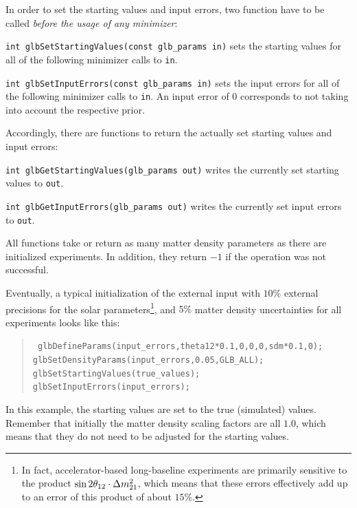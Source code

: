 In order to set the starting values and input errors, two function have to
 be called {\em before the usage of any minimizer}:
\begin{function}
{\tt int glbSetStartingValues(const glb\_params in)} sets the starting values for all of the following minimizer calls to {\tt in}.
\end{function}
\begin{function}
{\tt int glbSetInputErrors(const glb\_params in)}
 sets the input errors for all of the following minimizer calls to {\tt in}.
 An input error of $0$ corresponds to not taking into account the
 respective prior.
\end{function}
Accordingly, there are functions to return the actually set starting values
and input errors:
\begin{function}
{\tt int glbGetStartingValues(glb\_params out)} writes the currently
set starting values to {\tt out}.
\end{function}
\begin{function}
{\tt int glbGetInputErrors(glb\_params out)}
 writes the currently set input errors to {\tt out}.
\end{function}
All functions take or return as many matter density parameters as there are initialized experiments. In addition, they return $-1$ if the operation
was not successful.

Eventually, a typical initialization of the external input with
$10\%$ external precisions for the solar 
parameters\footnote{In fact, accelerator-based long-baseline experiments 
are primarily sensitive to the product $\sin 2 \theta_{12} \cdot \Delta m_{21}^2$, 
which means that these errors effectively add up to an error of this 
product of about $15\%$.}, 
and $5\%$ matter density uncertainties for all experiments looks like this:
\begin{quote}
{\tt
 glbDefineParams(input\_errors,theta12*0.1,0,0,0,sdm*0.1,0);\\  
 glbSetDensityParams(input\_errors,0.05,GLB\_ALL);\\
 glbSetStartingValues(true\_values);\\
 glbSetInputErrors(input\_errors);\\
}
\end{quote}
In this example, the starting values are set to 
the true (simulated) values. Remember that initially the 
matter density scaling factors are 
all $1.0$, which means that they do not need to be adjusted for the
starting values.

